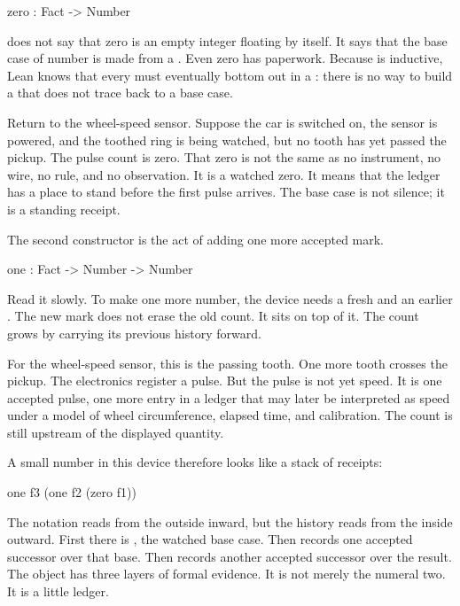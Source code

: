 \begin{leancode}
zero : Fact -> Number
\end{leancode}

does not say that zero is an empty integer floating by itself. It says that the
base case of number is made from a . Even zero has paperwork.
Because  is inductive, Lean knows that every  must
eventually bottom out in a : there is no way to build a
 that does not trace back to a base case.

Return to the wheel-speed sensor. Suppose the car is switched on, the sensor is
powered, and the toothed ring is being watched, but no tooth has yet passed the
pickup. The pulse count is zero. That zero is not the same as no instrument, no
wire, no rule, and no observation. It is a watched zero. It means that the
ledger has a place to stand before the first pulse arrives. The base case is
not silence; it is a standing receipt.

The second constructor is the act of adding one more accepted mark.

\begin{leancode}
one : Fact -> Number -> Number
\end{leancode}

Read it slowly. To make one more number, the device needs a fresh
 and an earlier . The new mark does not erase the old
count. It sits on top of it. The count grows by carrying its previous history
forward.

For the wheel-speed sensor, this is the passing tooth. One more tooth crosses
the pickup. The electronics register a pulse. But the pulse is not yet speed.
It is one accepted pulse, one more entry in a ledger that may later be
interpreted as speed under a model of wheel circumference, elapsed time, and
calibration. The count is still upstream of the displayed quantity.

A small number in this device therefore looks like a stack of receipts:

\begin{leancode}
one f3 (one f2 (zero f1))
\end{leancode}

The notation reads from the outside inward, but the history reads from the
inside outward. First there is , the watched base case. Then
 records one accepted successor over that base. Then
 records another accepted successor over the result. The object
has three layers of formal evidence. It is not merely the numeral two. It is a
little ledger.

